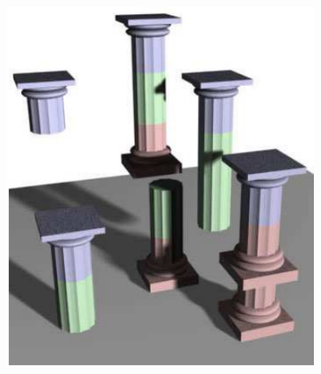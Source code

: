 \documentclass[b5paper,twoside,11pt]{article}
\begin{document}
\begin{figure}
\begin{subfigure}[b]{0.3\textwidth}
		\includegraphics[width=\textwidth]{1b}
		\caption{}
		\label{fig:1b}
	\end{subfigure}
	~ %
	\begin{subfigure}[b]{0.3\textwidth}

\end{subfigure}
\end{figure}
\end{document}
